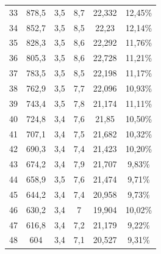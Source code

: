 \begin{longtable}{cccccc}
  33          & 878,5                & 3,5           & 8,7            & 22,332        & 12,45\%                         \\
  34          & 852,7                & 3,5           & 8,5            & 22,23         & 12,14\%                         \\
  35          & 828,3                & 3,5           & 8,6            & 22,292        & 11,76\%                         \\
  36          & 805,3                & 3,5           & 8,6            & 22,728        & 11,21\%                         \\
  37          & 783,5                & 3,5           & 8,5            & 22,198        & 11,17\%                         \\
  38          & 762,9                & 3,5           & 7,7            & 22,096        & 10,93\%                         \\
  39          & 743,4                & 3,5           & 7,8            & 21,174        & 11,11\%                         \\
  40          & 724,8                & 3,4           & 7,6            & 21,85         & 10,50\%                         \\
  41          & 707,1                & 3,4           & 7,5            & 21,682        & 10,32\%                         \\
  42          & 690,3                & 3,4           & 7,4            & 21,423        & 10,20\%                         \\
  43          & 674,2                & 3,4           & 7,9            & 21,707        & 9,83\%                          \\
  44          & 658,9                & 3,5           & 7,6            & 21,474        & 9,71\%                          \\
  45          & 644,2                & 3,4           & 7,4            & 20,958        & 9,73\%                          \\
  46          & 630,2                & 3,4           & 7              & 19,904        & 10,02\%                         \\
  47          & 616,8                & 3,4           & 7,2            & 21,179        & 9,22\%                          \\
  48          & 604                  & 3,4           & 7,1            & 20,527        & 9,31\%                          \\

\end{longtable}
